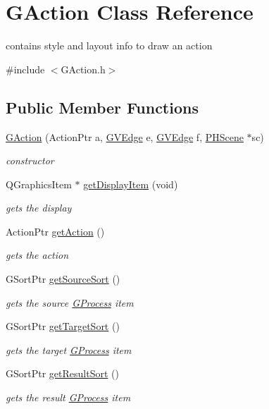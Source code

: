 \hypertarget{class_g_action}{\section{\-G\-Action \-Class \-Reference}
\label{class_g_action}
}


contains style and layout info to draw an action  




{\ttfamily \#include $<$\-G\-Action.\-h$>$}

\subsection*{\-Public \-Member \-Functions}
\begin{DoxyCompactItemize}
\item 
\hyperlink{class_g_action_a697f4b533d191139a1eb401c486afff9}{\-G\-Action} (\-Action\-Ptr a, \hyperlink{struct_g_v_edge}{\-G\-V\-Edge} e, \hyperlink{struct_g_v_edge}{\-G\-V\-Edge} f, \hyperlink{class_p_h_scene}{\-P\-H\-Scene} $\ast$sc)
\begin{DoxyCompactList}\small\item\em constructor \end{DoxyCompactList}\item 
\-Q\-Graphics\-Item $\ast$ \hyperlink{class_g_action_ad3086cca158b494f7c2fd31783fb9f77}{get\-Display\-Item} (void)
\begin{DoxyCompactList}\small\item\em gets the display \end{DoxyCompactList}\item 
\hypertarget{class_g_action_ac9005fd701c1362eea9d7299b95672cb}{\-Action\-Ptr \hyperlink{class_g_action_ac9005fd701c1362eea9d7299b95672cb}{get\-Action} ()}\label{class_g_action_ac9005fd701c1362eea9d7299b95672cb}

\begin{DoxyCompactList}\small\item\em gets the action \end{DoxyCompactList}\item 
\-G\-Sort\-Ptr \hyperlink{class_g_action_a1a76d059cb3b169b5e9dfeed00b41da3}{get\-Source\-Sort} ()
\begin{DoxyCompactList}\small\item\em gets the source \hyperlink{class_g_process}{\-G\-Process} item \end{DoxyCompactList}\item 
\-G\-Sort\-Ptr \hyperlink{class_g_action_a77a2ac1b8a697c066dcf9d6624bb4fa0}{get\-Target\-Sort} ()
\begin{DoxyCompactList}\small\item\em gets the target \hyperlink{class_g_process}{\-G\-Process} item \end{DoxyCompactList}\item 
\-G\-Sort\-Ptr \hyperlink{class_g_action_addc1ebc84b2c739d4fa78d8938f9c6c3}{get\-Result\-Sort} ()
\begin{DoxyCompactList}\small\item\em gets the result \hyperlink{class_g_process}{\-G\-Process} item \end{DoxyCompactList}\end{DoxyCompactItemize}
